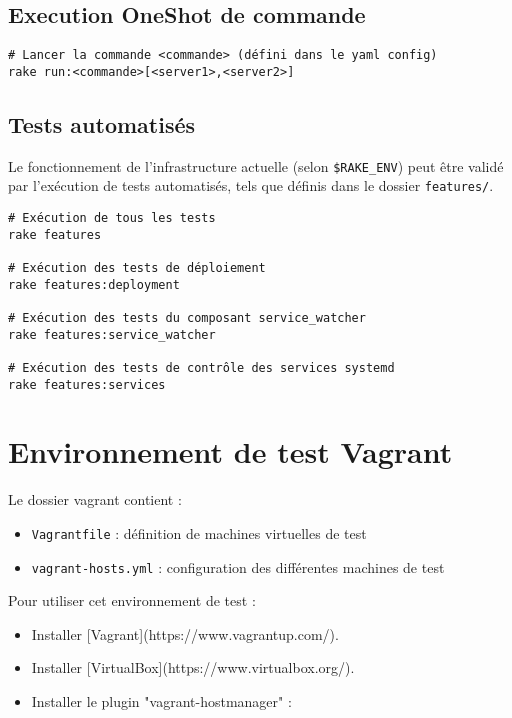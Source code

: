 \documentclass[a4paper,oneside,11pt]{article}
\begin{document}
\subsection{Execution OneShot de commande}

\begin{verbatim}
# Lancer la commande <commande> (défini dans le yaml config)
rake run:<commande>[<server1>,<server2>]
\end{verbatim}


\subsection{Tests automatisés}

Le fonctionnement de l'infrastructure actuelle (selon \verb!$RAKE_ENV!) peut être
validé par l'exécution de tests automatisés, tels que définis dans le dossier
\verb!features/!.

\begin{verbatim}
# Exécution de tous les tests
rake features

# Exécution des tests de déploiement
rake features:deployment

# Exécution des tests du composant service_watcher
rake features:service_watcher

# Exécution des tests de contrôle des services systemd
rake features:services
\end{verbatim}


\section{Environnement de test Vagrant}

Le dossier vagrant contient :
\begin{itemize}
	\item  \verb!Vagrantfile! : définition de machines virtuelles de test
	\item  \verb!vagrant-hosts.yml! : configuration des différentes machines de test
\end{itemize}

Pour utiliser cet environnement de test :

\begin{itemize}
\item Installer [Vagrant](https://www.vagrantup.com/).
\item Installer [VirtualBox](https://www.virtualbox.org/).
\item Installer le plugin "vagrant-hostmanager" :
\end{itemize}
\end{document}
